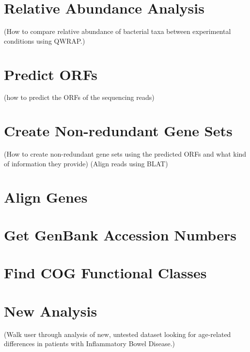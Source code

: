 
\chapter{Relative Abundance Analysis}
(How to compare relative abundance of bacterial taxa between experimental conditions using QWRAP.)

\chapter{Predict ORFs}
(how to predict the ORFs of the sequencing reads)

\chapter{Create Non-redundant Gene Sets}
(How to create non-redundant gene sets using the predicted ORFs and what kind of information they provide)
(Align reads using BLAT)

\chapter{Align Genes}

\chapter{Get GenBank Accession Numbers}

\chapter{Find COG Functional Classes}

\chapter{New Analysis}
(Walk user through analysis of new, untested dataset looking for age-related differences in patients with Inflammatory Bowel Disease.)

